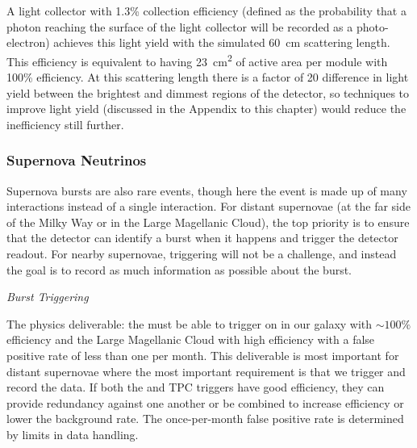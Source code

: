 A light collector with 1.3\% collection efficiency (defined as the probability that a photon reaching the surface of the light collector will be recorded as a photo-electron) achieves this light yield with the simulated \SI{60}{cm} scattering length. This efficiency is equivalent to having \SI{23}{cm^2} of active area per module with 100\% efficiency. At this scattering length there is a factor of 20 difference in light yield between the brightest and dimmest regions of the detector, so techniques to improve light yield (discussed in the Appendix to this chapter) would reduce the inefficiency still further.


\subsubsection{Supernova Neutrinos}
\label{subsec:fdsp-pd-simphys-snb}

Supernova bursts are also rare events, though here the event is made up of many interactions instead of a single interaction. For distant supernovae (at the far side of the Milky Way or in the Large Magellanic Cloud), the top priority is to ensure that the detector can identify a burst when it happens and trigger the detector readout. For nearby supernovae, triggering will not be a challenge, and instead the goal is to record as much information as possible about the burst.

\textit{Burst Triggering}


The physics deliverable: the  must be able to trigger on  in our galaxy with $\sim100\%$ efficiency and the Large Magellanic Cloud with high efficiency with a false positive rate of less than one per month. This deliverable is most important for distant supernovae where the most important requirement is that we trigger and record the data. If both the  and TPC triggers have good efficiency, they can provide redundancy against one another or be combined to increase efficiency or lower the background rate. The once-per-month false positive rate is determined by limits in data handling.

